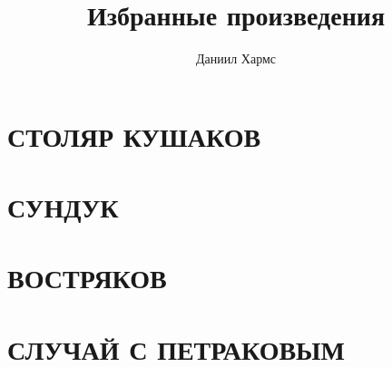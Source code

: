 \documentclass[12pt]{article}
\title{Избранные произведения}
\author{Даниил Хармс}
\date{}
\begin{document}
	
	\maketitle
	
	\section{СТОЛЯР КУШАКОВ}
	
	
	\section{СУНДУК}
	
	
	\section{ВОСТРЯКОВ}
	
	
	\section{СЛУЧАЙ С ПЕТРАКОВЫМ}
	
	
\end{document}
